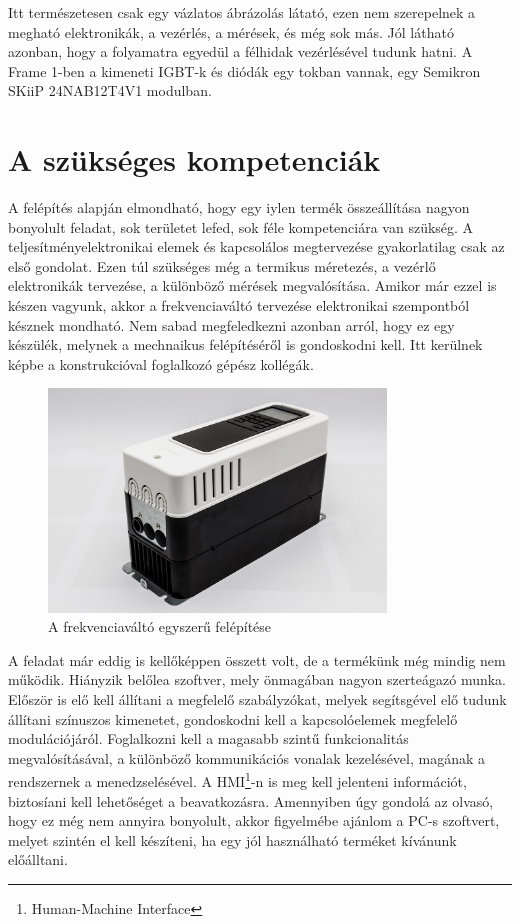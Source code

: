 Itt természetesen csak egy vázlatos ábrázolás látató, ezen nem szerepelnek a megható elektronikák, a vezérlés, a mérések, és még sok más. Jól látható azonban, hogy a folyamatra egyedül a félhidak vezérlésével tudunk hatni. A Frame 1-ben a kimeneti IGBT-k és diódák egy tokban vannak, egy Semikron SKiiP 24NAB12T4V1 modulban. \cite{sutozoli} \cite{ctan}

\section{A szükséges kompetenciák}

A felépítés alapján elmondható, hogy egy iylen termék összeállítása nagyon bonyolult feladat, sok területet lefed, sok féle kompetenciára van szükség. A teljesítményelektronikai elemek és kapcsolálos megtervezése gyakorlatilag csak az első gondolat. Ezen túl szükséges még a termikus méretezés, a vezérlő elektronikák tervezése, a különböző mérések megvalósítása. Amikor már ezzel is készen vagyunk, akkor a frekvenciaváltó tervezése elektronikai szempontból késznek mondható. Nem sabad megfeledkezni azonban arról, hogy ez egy készülék, melynek a mechnaikus felépítéséről is gondoskodni kell. Itt kerülnek képbe a konstrukcióval foglalkozó gépész kollégák.

\begin{figure}[h]
	\centering
	\includegraphics[width = 0.8\textwidth]{figures/n700_proto.jpg}
	\caption{A frekvenciaváltó egyszerű felépítése} 
	\label{fig:n700_proto}
\end{figure}

A feladat már eddig is kellőképpen összett volt, de a termékünk még mindig nem működik. Hiányzik belőlea szoftver, mely önmagában nagyon szerteágazó munka. Először is elő kell állítani a megfelelő szabályzókat, melyek segítsgével elő tudunk állítani színuszos kimenetet, gondoskodni kell a kapcsolóelemek megfelelő modulációjáról. Foglalkozni kell a magasabb szintű funkcionalitás megvalósításával, a különböző kommunikációs vonalak kezelésével, magának a rendszernek a menedzselésével. A HMI\footnote{Human-Machine Interface}-n is meg kell jelenteni információt, biztosíani kell lehetőséget a beavatkozásra. Amennyiben úgy gondolá az olvasó, hogy ez még nem annyira bonyolult, akkor figyelmébe ajánlom a PC-s szoftvert, melyet szintén el kell készíteni, ha egy jól használható terméket kívánunk előálltani. 

